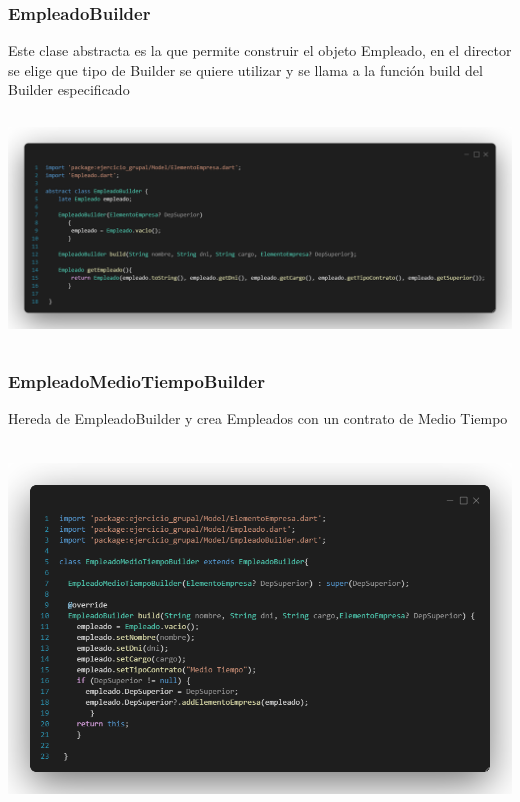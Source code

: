 \documentclass[
]{article}
\begin{document}
\subsubsection{EmpleadoBuilder}\label{empleadobuilder}

Este clase abstracta es la que permite construir el objeto Empleado, en
el director se elige que tipo de Builder se quiere utilizar y se llama a
la función build del Builder especificado

\includegraphics[width=5.90522in,height=2.375in]{imagenes/EmpleadoBuilder.png}

\subsubsection{EmpleadoMedioTiempoBuilder}\label{empleadomediotiempobuilder}

Hereda de EmpleadoBuilder y crea Empleados con un contrato de Medio
Tiempo

\includegraphics[width=5.90522in,height=3.875in]{imagenes/MedioTiempo.png}
\end{document}
